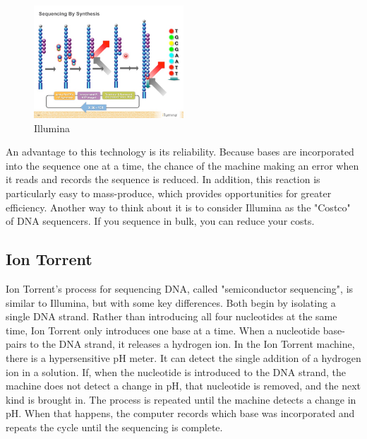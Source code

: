 \documentclass[12pt,letterpaper]{report}
\begin{document}
\begin{figure}
\vspace{-20pt}
  \begin{center}
    \includegraphics[width=0.5\textwidth]{illumina_fig.png}
  \end{center}
  \vspace{-20pt}
  \caption[Illumina]{Illumina \protect\cite{illuminafigure}}
  \vspace{-10pt}
  \label{fig:illumina}
\end{figure}

An advantage to this technology is its reliability. Because bases are incorporated into the sequence one at a time, the chance of the machine making an error when it reads and records the sequence is reduced. In addition, this reaction is particularly easy to mass-produce, which provides opportunities for greater efficiency. Another way to think about it is to consider Illumina as the "Costco" of DNA sequencers. If you sequence in bulk, you can reduce your costs.

\subsection{Ion Torrent}

Ion Torrent's process for sequencing DNA, called "semiconductor sequencing", is similar to Illumina, but with some key differences. Both begin by isolating a single DNA strand. Rather than introducing all four nucleotides at the same time, Ion Torrent only introduces one base at a time. When a nucleotide base-pairs to the DNA strand, it releases a hydrogen ion. In the Ion Torrent machine, there is a hypersensitive pH meter. It can detect the single addition of a hydrogen ion in a solution. If, when the nucleotide is introduced to the DNA strand, the machine does not detect a change in pH, that nucleotide is removed, and the next kind is brought in. The process is repeated until the machine detects a change in pH. When that happens, the computer records which base was incorporated and repeats the cycle until the sequencing is complete.
\end{document}
